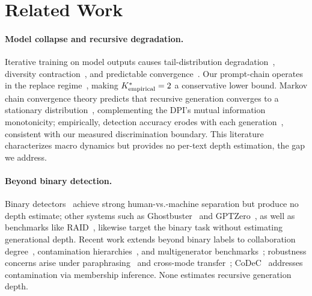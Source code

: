 \section{Related Work}
\label{sec:related_work}

\paragraph{Model collapse and recursive degradation.}
Iterative training on model outputs causes tail-distribution degradation~\cite{shumailov2024collapse, alemohammad2024selfconsuming, dohmatob2024model, dohmatob2025strong, fu2025theoretical}, diversity contraction~\cite{guo2024curious, padmakumar2024writing, briesch2023selfconsuming}, and predictable convergence~\cite{schaeffer2025position, kazdan2025collapse, gerstgrasser2024model, wang2025unveiling}.
Our prompt-chain operates in the replace regime~\cite{kazdan2025collapse}, making ${K^*_{\text{empirical}}} = 2$ a conservative lower bound.
Markov chain convergence theory predicts that recursive generation converges to a stationary distribution~\cite{fu2025theoretical}, complementing the DPI's mutual information monotonicity; empirically, detection accuracy erodes with each generation~\cite{hao2025rewrite}, consistent with our measured discrimination boundary.
This literature characterizes macro dynamics but provides no per-text depth estimation, the gap we address.

\paragraph{Beyond binary detection.}
Binary detectors~\cite{mitchell2023detectgpt, bao2024fast, hans2024binoculars, basani2026diveye, zhang2024minkpp} achieve strong human-vs.-machine separation but produce no depth estimate; other systems such as Ghostbuster~\cite{verma2024ghostbuster} and GPTZero~\cite{liang2023gpt}, as well as benchmarks like RAID~\cite{dugan2024raid}, likewise target the binary task without estimating generational depth.
Recent work extends beyond binary labels to collaboration degree~\cite{cheng2025beyond}, contamination hierarchies~\cite{mehta2025beyond}, and multigenerator benchmarks~\cite{wang2024semeval}; robustness concerns arise under paraphrasing~\cite{sadasivan2023detect, krishna2023paraphrasing} and cross-mode transfer~\cite{hao2025rewrite}; CoDeC~\cite{zawalski2026codec} addresses contamination via membership inference.
None estimates recursive generation depth.

